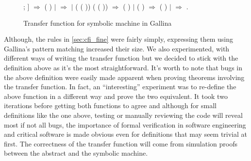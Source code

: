 \begin{figure}[ht]
\begin{coqdoccode}
  ; ] \ensuremath{\Rightarrow} \coqdoceol
  \coqdocindent{2.00em}  (
   )\coqdoceol \coqdocindent{1.00em}
  \ensuremath{|}   \coqdocvar{\_}
  \coqdocvar{\_} \coqdocvar{\_} \ensuremath{\Rightarrow}
  \coqdoceol \coqdocindent{1.00em} \ensuremath{|}
   \coqdocvar{\_} (
  ( )) (
  ( )) \coqdocvar{\_}
  \ensuremath{\Rightarrow} \coqdoceol \coqdocindent{2.00em}
     
    (
   ) 
  \coqdoceol \coqdocindent{1.00em} \ensuremath{|}
   \coqdocvar{\_} 
  ( \coqdocvar{\_}) \coqdocvar{\_}
  \ensuremath{\Rightarrow} \coqdoceol \coqdocindent{2.00em}
   ( 
  )\coqdoceol \coqdocindent{1.00em} \ensuremath{|}
   \coqdocvar{\_} \coqdocvar{\_} \coqdocvar{\_}
  \coqdocvar{\_} \ensuremath{\Rightarrow} \coqdoceol
  \coqdocindent{1.00em} .\coqdoceol
\end{coqdoccode}
\caption{Transfer function for symbolic machine in Gallina}
\label{fig:transfer_coq}
\end{figure}


Although, the rules in \ref{sec:cfi_fine} were fairly simply,
expressing them using Gallina's pattern matching increased their
size. We also experimented, with different ways of writing the
transfer function but we decided to stick with the definition above as
it's the most straightforward. It's worth to note that bugs in the
above definition were easily made apparent when proving theorems
involving the transfer function. In fact, an ``interesting''
experiment was to re-define the above function in a different way and
prove the two equivalent. It took two iterations before getting both
functions to agree and although for small definitions like the one
above, testing or manually reviewing the code will reveal most if not
all bugs, the importance of formal verification in software
engineering and critical software is made obvious even for definitions
that may seem trivial at first. The correctness of the transfer
function will come from simulation proofs between the abstract and the
symbolic machine.

